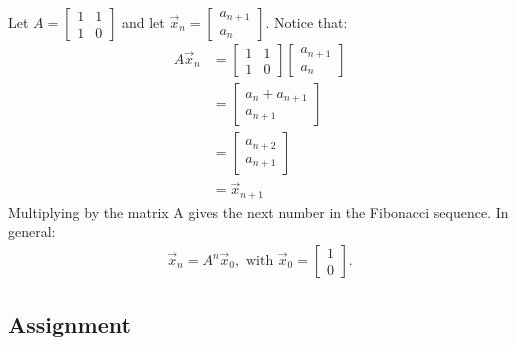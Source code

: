 \documentclass{article}
\begin{document}
Let $A = \begin{bmatrix}
    1 & 1 \\
    1 & 0
  \end{bmatrix}$ and let $\vec{x}_n = \begin{bmatrix}
    a_{n+1} \\
    a_n
  \end{bmatrix}$. Notice that:
\begin{align*}
  A\vec{x}_n & = \begin{bmatrix}
                   1 & 1 \\
                   1 & 0
                 \end{bmatrix} \begin{bmatrix}
                                 a_{n+1} \\
                                 a_n
                               \end{bmatrix} \\[1ex]
             & = \begin{bmatrix}
                   a_n + a_{n+1} \\
                   a_{n+1}
                 \end{bmatrix}               \\[1ex]
             & = \begin{bmatrix}
                   a_{n+2} \\
                   a_{n+1}
                 \end{bmatrix}               \\[1ex]
             & = \vec{x}_{n+1}
\end{align*}
Multiplying by the matrix A gives the next number in the Fibonacci sequence. In general:
\begin{align*}
  \vec{x}_n = A^n \vec{x}_0, \text{ with } \vec{x}_0 = \begin{bmatrix} 1 \\ 0 \end{bmatrix}.
\end{align*}

\subsection{Assignment}
\end{document}
